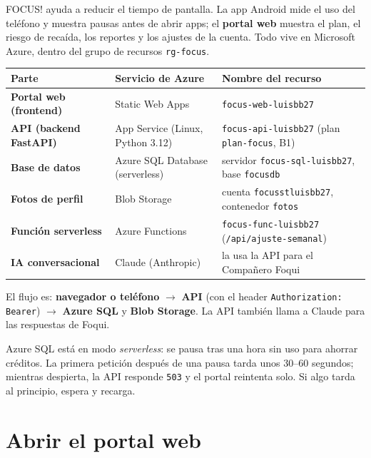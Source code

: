 \documentclass[11pt,a4paper]{article}
\newcommand{\ruta}[1]{\texttt{\color{marino}#1}}
\begin{document}
FOCUS! ayuda a reducir el tiempo de pantalla. La app Android mide el uso del teléfono y muestra pausas
antes de abrir apps; el \textbf{portal web} muestra el plan, el riesgo de recaída, los reportes y los
ajustes de la cuenta. Todo vive en Microsoft Azure, dentro del grupo de recursos \texttt{rg-focus}.

\begin{center}
\renewcommand{\arraystretch}{1.25}
\begin{tabularx}{\textwidth}{>{\bfseries}l l X}
\toprule
Parte & Servicio de Azure & Nombre del recurso \\
\midrule
Portal web (frontend) & Static Web Apps & \texttt{focus-web-luisbb27} \\
API (backend FastAPI) & App Service (Linux, Python 3.12) & \texttt{focus-api-luisbb27} (plan \texttt{plan-focus}, B1) \\
Base de datos & Azure SQL Database (serverless) & servidor \texttt{focus-sql-luisbb27}, base \texttt{focusdb} \\
Fotos de perfil & Blob Storage & cuenta \texttt{focusstluisbb27}, contenedor \texttt{fotos} \\
Función serverless & Azure Functions & \texttt{focus-func-luisbb27} (\ruta{/api/ajuste-semanal}) \\
IA conversacional & Claude (Anthropic) & la usa la API para el Compañero Foqui \\
\bottomrule
\end{tabularx}
\end{center}

\noindent El flujo es: \textbf{navegador o teléfono} $\rightarrow$ \textbf{API} (con el header
\texttt{Authorization: Bearer}) $\rightarrow$ \textbf{Azure SQL} y \textbf{Blob Storage}. La API también llama a
Claude para las respuestas de Foqui.

\begin{nota}
Azure SQL está en modo \emph{serverless}: se pausa tras una hora sin uso para ahorrar créditos.
La primera petición después de una pausa tarda unos 30--60 segundos; mientras despierta, la API
responde \texttt{503} y el portal reintenta solo. Si algo tarda al principio, espera y recarga.
\end{nota}

\section{Abrir el portal web}
\end{document}
